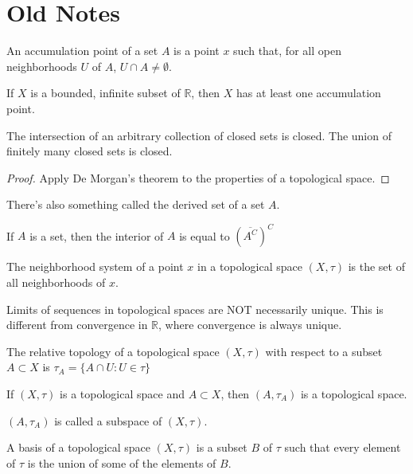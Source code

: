 \section{Old Notes}
    An accumulation point of a set $A$ is a point $x$ such that, for all open
    neighborhoods $U$ of $A$, $U\cap{A}\ne\emptyset$.
    \begin{theorem}
        If $X$ is a bounded, infinite subset of $\mathbb{R}$, then $X$ has at
        least one accumulation point.
    \end{theorem}
    \begin{theorem}
        The intersection of an arbitrary collection of closed sets is closed.
        The union of finitely many closed sets is closed.
    \end{theorem}
    \begin{proof}
        Apply De Morgan's theorem to the properties of a topological space.
    \end{proof}
    There's also something called the derived set of a set $A$.
    \begin{theorem}
        If $A$ is a set, then the interior of $A$ is equal to
        $(\overline{A^{C}})^{C}$
    \end{theorem}
    \begin{definition}
        The neighborhood system of a point $x$ in a topological space $(X,\tau)$
        is the set of all neighborhoods of $x$.
    \end{definition}
    Limits of sequences in topological spaces are NOT
    necessarily unique. This is different from convergence
    in $\mathbb{R}$, where convergence is always unique.
    \begin{definition}
        The relative topology of a
        topological space $(X,\tau)$ with
        respect to a subset $A\subset{X}$
        is $\tau_{A}=\{A\cap{U}:U\in\tau\}$
    \end{definition}
    \begin{theorem}
        If $(X,\tau)$ is a topological space and
        $A\subset{X}$, then
        $(A,\tau_{A})$ is a topological space.
    \end{theorem}
    $(A,\tau_{A})$ is called a subspace of
    $(X,\tau)$.
    \begin{definition}
        A basis of a topological space
        $(X,\tau)$ is a subset $B$ of
        $\tau$ such that every element
        of $\tau$ is the union of some of the
        elements of $B$.
    \end{definition}
